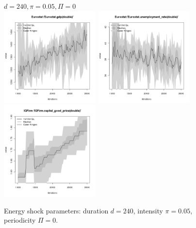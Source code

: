 \begin{figure}[ht!]
\centering\leavevmode
\begin{minipage}{17cm}
\centering\leavevmode
{$d=240, \pi=0.05, \Pi=0$}\\
\includegraphics[width=5cm]{./energy_shock/png/duration_240/intensity_0.05/frequency_0/Eurostat-gdp.png}
\includegraphics[width=5cm]{./energy_shock/png/duration_240/intensity_0.05/frequency_0/Eurostat-unemployment_rate.png}
\includegraphics[width=5cm]{./energy_shock/png/duration_240/intensity_0.05/frequency_0/IGFirm-capital_good_price.png}
\end{minipage}
\caption{Energy shock parameters: duration $d=240$, intensity $\pi=0.05$, periodicity $\Pi=0$.}
\label{Figure: energy shock 2}
\end{figure}

